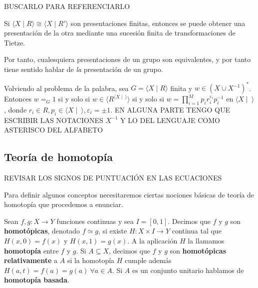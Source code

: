 \documentclass[bibtex, anon]{TEMat-article}
\providecommand{\gene}[1]{\langle{#1}\rangle}
\begin{document}
BUSCARLO PARA REFERENCIARLO
\begin{teorema}
	Si $\gene{X\mid R}\cong\gene{X\mid R'}$ son presentaciones finitas, entonces se puede obtener una presentación de la otra mediante una sucesión finita de transformaciones de Tietze.
\end{teorema}

Por tanto, cualesquiera presentaciones de un grupo son equivalentes, y por tanto tiene sentido hablar de \emph{la} presentación de un grupo. 

Volviendo al problema de la palabra, sea $G=\gene{X\mid R}$ finita y $w\in (X\cup X^{-1})^*$. Entonces $w=_G 1$ si y solo si $w\in \gene{R^{\gene{X\mid\ }}}$ si y solo si $w=\displaystyle\prod_{i=1}^M p_ir_i^{\varepsilon_i}p_i^{-1}$ en $\gene{X\mid\ }$, donde $r_i\in R, p_i\in\gene{X\mid\ }, \varepsilon_i=\pm 1$. EN ALGUNA PARTE TENGO QUE ESCRIBIR LAS NOTACIONES $X^{-1}$ Y LO DEL LENGUAJE COMO ASTERISCO DEL ALFABETO


\subsection{Teoría de homotopía}
REVISAR LOS SIGNOS DE PUNTUACIÓN EN LAS ECUACIONES

Para definir algunos conceptos necesitaremos ciertas nociones básicas de teoría de homotopía que procedemos a enunciar.

\begin{definicion} Sean $f,g:X\to Y$ funciones continuas y sea $I=[0,1]$. Decimos que $f$ y $g$ son \textbf{homotópicas}, denotado $f\simeq g$, si existe $H:X\times I\to Y$ continua tal que $H(x,0)=f(x)$ y $H(x,1)=g(x)$. A la aplicación $H$ la llamamos \textbf{homotopía} entre $f$ y $g$. %
		Si $A\subseteq X$, decimos que $f$ y $g$ son \textbf{homotópicas relativamente} a $A$ si la homotopía $H$ cumple además $H(a,t)=f(a)=g(a)\ \forall a\in A$. Si $A$ es un conjunto unitario hablamos de \textbf{homotopía basada}. %
\end{definicion}
\end{document}
